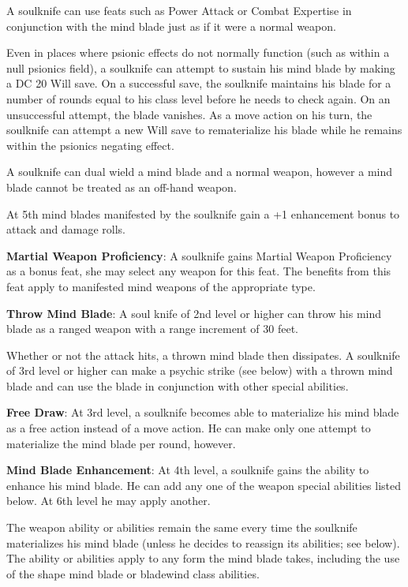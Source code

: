 A soulknife can use feats such as Power Attack or Combat Expertise in conjunction with the mind blade just as if it were a normal weapon. 

Even in places where psionic effects do not normally function (such as within a null psionics field), a soulknife can attempt to sustain his mind blade by making a DC 20 Will save. On a successful save, the soulknife maintains his blade for a number of rounds equal to his class level before he needs to check again. On an unsuccessful attempt, the blade vanishes. As a move action on his turn, the soulknife can attempt a new Will save to rematerialize his blade while he remains within the psionics negating effect.

A soulknife can dual wield a mind blade and a normal weapon, however a mind blade cannot be treated as an off-hand weapon.

At 5th mind blades manifested by the soulknife gain a +1 enhancement bonus to attack and damage rolls.

\textbf{Martial Weapon Proficiency}: A soulknife gains Martial Weapon Proficiency as a bonus feat, she may select any weapon for this feat. The benefits from this feat apply to manifested mind weapons of the appropriate type.

\textbf{Throw Mind Blade}: A soul knife of 2nd level or higher can throw his mind blade as a ranged weapon with a range increment of 30 feet.

Whether or not the attack hits, a thrown mind blade then dissipates. A soulknife of 3rd level or higher can make a psychic strike (see below) with a thrown mind blade and can use the blade in conjunction with other special abilities.

\textbf{Free Draw}: At 3rd level, a soulknife becomes able to materialize his mind blade as a free action instead of a move action. He can make only one attempt to materialize the mind blade per round, however.

\textbf{Mind Blade Enhancement}: At 4th level, a soulknife gains the ability to enhance his mind blade. He can add any one of the weapon special abilities listed below. At 6th level he may apply another.

The weapon ability or abilities remain the same every time the soulknife materializes his mind blade (unless he decides to reassign its abilities; see below). The ability or abilities apply to any form the mind blade takes, including the use of the shape mind blade or bladewind class abilities.

